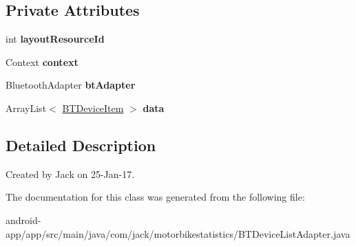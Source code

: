 \subsection*{Private Attributes}
\begin{DoxyCompactItemize}
\item 
\mbox{\label{classcom_1_1jack_1_1motorbikestatistics_1_1_b_t_device_list_adapter_a3f7a9f653fb6a0fcda0a0a61e29d0f06}} 
int {\bfseries layout\+Resource\+Id}
\item 
\mbox{\label{classcom_1_1jack_1_1motorbikestatistics_1_1_b_t_device_list_adapter_a6e42efbb29008651704bef82263ae838}} 
Context {\bfseries context}
\item 
\mbox{\label{classcom_1_1jack_1_1motorbikestatistics_1_1_b_t_device_list_adapter_ab57217b9f64d8520346101362d0ebca1}} 
Bluetooth\+Adapter {\bfseries bt\+Adapter}
\item 
\mbox{\label{classcom_1_1jack_1_1motorbikestatistics_1_1_b_t_device_list_adapter_a7e0dfcd0a703aaecf0c0457515b6984f}} 
Array\+List$<$ \hyperlink{classcom_1_1jack_1_1motorbikestatistics_1_1_b_t_device_item}{B\+T\+Device\+Item} $>$ {\bfseries data}
\end{DoxyCompactItemize}


\subsection{Detailed Description}
Created by Jack on 25-\/\+Jan-\/17. 

The documentation for this class was generated from the following file\+:\begin{DoxyCompactItemize}
\item 
android-\/app/app/src/main/java/com/jack/motorbikestatistics/B\+T\+Device\+List\+Adapter.\+java\end{DoxyCompactItemize}
